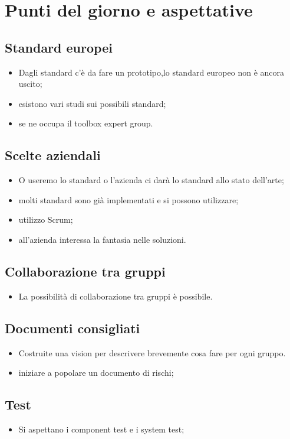 \section{Punti del giorno e aspettative}

    \subsection{Standard europei}
    \begin{itemize}
        \item Dagli standard c'è da fare un prototipo,lo standard europeo non è ancora uscito;
        \item esistono vari studi sui possibili standard;
        \item se ne occupa il toolbox expert group.
    \end{itemize}
    \subsection{Scelte aziendali}
    \begin{itemize}
        \item O useremo lo standard o l'azienda ci darà lo standard allo stato
         dell'arte;
        \item molti standard sono già implementati e si possono utilizzare;
        \item utilizzo Scrum;
        \item all'azienda interessa la fantasia nelle soluzioni.
    \end{itemize}
    \subsection{Collaborazione tra gruppi}
    \begin{itemize}
        \item La possibilità di collaborazione tra gruppi è possibile.
    \end{itemize}
    \subsection{Documenti consigliati}
    \begin{itemize}
        \item Costruite una vision per descrivere brevemente cosa fare per ogni gruppo.
        \item iniziare a popolare un documento di rischi;
    \end{itemize}
    \subsection{Test }
    \begin{itemize}
        \item Si aspettano i component test e i system test;
    \end{itemize}

